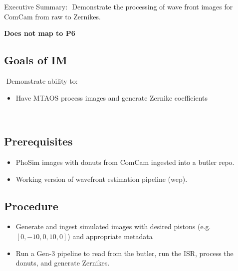 Executive Summary:
​
Demonstrate the processing of wave front images for ComCam from raw to Zernikes.

\textbf{Does not map to P6}
​
\subsection{Goals of IM}
​
Demonstrate ability to:
​
\begin{itemize}
\item Have MTAOS process images and generate Zernike coefficients
\end{itemize}
​
\subsection{Prerequisites}
\begin{itemize}
\item PhoSim images with donuts from ComCam ingested into a butler repo.
\item Working version of wavefront estimation pipeline (wep). 
\end{itemize}

\subsection{Procedure}
\begin{itemize}
\item Generate and ingest simulated images with desired pistons (e.g. $[0, -10, 0, 10, 0]$) and appropriate
  metadata
\item Run a Gen-3 pipeline to read from the butler, run the ISR, process the donuts, and generate Zernikes.
\end{itemize}
